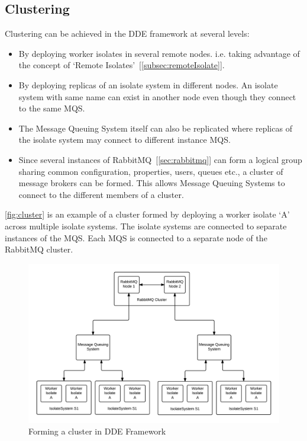 \subsection{Clustering}
  Clustering can be achieved in the \acrshort{DDE} framework at several levels:
  \begin{itemize}
  \item By deploying worker isolates in several remote nodes. i.e. taking advantage of the concept of ‘Remote Isolates’~[\autoref{subsec:remoteIsolate}].
  \item By deploying replicas of an isolate system in different nodes. An isolate system with same name can exist in another node even though they connect to the same MQS.
  \item The Message Queuing System itself can also be replicated where replicas of the isolate system may connect to different instance MQS.
  \item Since several instances of RabbitMQ~[\autoref{sec:rabbitmq}] can form a logical group sharing common configuration, properties, users, queues etc., a cluster of message brokers can be formed. This allows Message Queuing Systems to connect to the different members of a cluster.
  \end{itemize}

  \autoref{fig:cluster} is an example of a cluster formed by deploying a worker isolate ‘A’ across multiple isolate systems. The isolate systems are connected to separate instances of the MQS. Each MQS is connected to a separate node of the RabbitMQ cluster.

\begin{figure}[H]
  \centering
  \includegraphics[width=1\textwidth]{figures/cluster}
  \caption[Forming a cluster in \acrshort{DDE} Framework]{Forming a cluster in \acrshort{DDE} Framework}
  \label{fig:cluster}
\end{figure}

